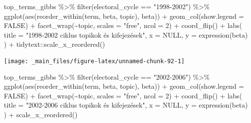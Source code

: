 \documentclass[
]{book}
\newenvironment{Shaded}{\begin{snugshade}}{\end{snugshade}}
\newcommand{\AttributeTok}[1]{\textcolor[rgb]{0.77,0.63,0.00}{#1}}
\newcommand{\ConstantTok}[1]{\textcolor[rgb]{0.00,0.00,0.00}{#1}}
\newcommand{\DecValTok}[1]{\textcolor[rgb]{0.00,0.00,0.81}{#1}}
\newcommand{\FunctionTok}[1]{\textcolor[rgb]{0.00,0.00,0.00}{#1}}
\newcommand{\NormalTok}[1]{#1}
\newcommand{\SpecialCharTok}[1]{\textcolor[rgb]{0.00,0.00,0.00}{#1}}
\newcommand{\StringTok}[1]{\textcolor[rgb]{0.31,0.60,0.02}{#1}}
\begin{document}
\begin{Shaded}
\begin{Highlighting}[]
\NormalTok{top\_terms\_gibbs }\SpecialCharTok{\%\textgreater{}\%}
  \FunctionTok{filter}\NormalTok{(electoral\_cycle }\SpecialCharTok{==} \StringTok{"1998{-}2002"}\NormalTok{) }\SpecialCharTok{\%\textgreater{}\%}
  \FunctionTok{ggplot}\NormalTok{(}\FunctionTok{aes}\NormalTok{(}\FunctionTok{reorder\_within}\NormalTok{(term, beta, topic), beta)) }\SpecialCharTok{+}
  \FunctionTok{geom\_col}\NormalTok{(}\AttributeTok{show.legend =} \ConstantTok{FALSE}\NormalTok{) }\SpecialCharTok{+}
  \FunctionTok{facet\_wrap}\NormalTok{(}\SpecialCharTok{\textasciitilde{}}\NormalTok{topic, }\AttributeTok{scales =} \StringTok{"free"}\NormalTok{, }\AttributeTok{ncol =} \DecValTok{2}\NormalTok{) }\SpecialCharTok{+}
  \FunctionTok{coord\_flip}\NormalTok{() }\SpecialCharTok{+}
  \FunctionTok{labs}\NormalTok{(}
    \AttributeTok{title =} \StringTok{"1998{-}2002 ciklus topikok és kifejezések"}\NormalTok{,}
    \AttributeTok{x =} \ConstantTok{NULL}\NormalTok{,}
    \AttributeTok{y =} \FunctionTok{expression}\NormalTok{(beta)}
\NormalTok{  ) }\SpecialCharTok{+}
\NormalTok{  tidytext}\SpecialCharTok{::}\FunctionTok{scale\_x\_reordered}\NormalTok{()}
\end{Highlighting}
\end{Shaded}

\begin{center}\texttt{[image: \_main\_files/figure-latex/unnamed-chunk-92-1]} \end{center}

\begin{Shaded}
\begin{Highlighting}[]
\NormalTok{top\_terms\_gibbs }\SpecialCharTok{\%\textgreater{}\%}
  \FunctionTok{filter}\NormalTok{(electoral\_cycle }\SpecialCharTok{==} \StringTok{"2002{-}2006"}\NormalTok{) }\SpecialCharTok{\%\textgreater{}\%}
  \FunctionTok{ggplot}\NormalTok{(}\FunctionTok{aes}\NormalTok{(}\FunctionTok{reorder\_within}\NormalTok{(term, beta, topic), beta)) }\SpecialCharTok{+}
  \FunctionTok{geom\_col}\NormalTok{(}\AttributeTok{show.legend =} \ConstantTok{FALSE}\NormalTok{) }\SpecialCharTok{+}
  \FunctionTok{facet\_wrap}\NormalTok{(}\SpecialCharTok{\textasciitilde{}}\NormalTok{topic, }\AttributeTok{scales =} \StringTok{"free"}\NormalTok{, }\AttributeTok{ncol =} \DecValTok{2}\NormalTok{) }\SpecialCharTok{+}
  \FunctionTok{coord\_flip}\NormalTok{() }\SpecialCharTok{+}
  \FunctionTok{labs}\NormalTok{(}
    \AttributeTok{title =} \StringTok{"2002{-}2006 ciklus topikok és kifejezések"}\NormalTok{,}
    \AttributeTok{x =} \ConstantTok{NULL}\NormalTok{,}
    \AttributeTok{y =} \FunctionTok{expression}\NormalTok{(beta)}
\NormalTok{  ) }\SpecialCharTok{+}
  \FunctionTok{scale\_x\_reordered}\NormalTok{()}
\end{Highlighting}
\end{Shaded}
\end{document}
